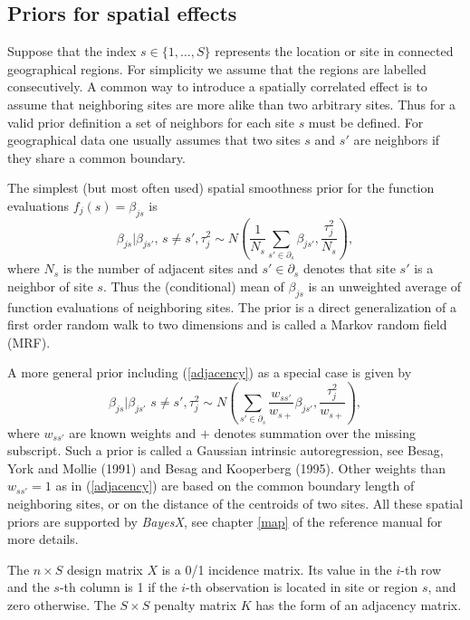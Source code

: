\documentclass[11pt,a4paper,twoside]{bayesxarticle}
\begin{document}
\subsection{Priors for spatial effects}
\label{spatial}

Suppose that the index $s \in \{ 1,\dots,S \}$ represents the
location or site in connected geographical regions. For simplicity
we assume that the regions are labelled consecutively. A common
way to introduce a spatially correlated effect is to assume that
neighboring sites are more alike than two arbitrary sites. Thus
for a valid prior definition a set of neighbors for each site $s$
must be defined. For geographical data one usually assumes that
two sites $s$ and $s'$ are neighbors if they share a common
boundary.

The simplest (but most often used) spatial smoothness prior for
the function evaluations $f_j(s)=\beta_{js}$ is
\begin{equation}
\label{adjacency} \beta_{js} | \beta_{js'}, \, {s \neq
s'},\tau_j^2 \sim N \left( \frac{1}{N_s} \sum_{s' \in \partial_s}
\beta_{js'} , \frac{\tau_j^2}{N_s} \right),
\end{equation}
where $N_s$ is the number of adjacent sites and $s' \in
\partial_s$ denotes that site $s'$ is a neighbor of site $s$. Thus
the (conditional) mean of $\beta_{js}$ is an unweighted average of
function evaluations of neighboring sites. The prior is a direct
generalization of a first order random walk to two dimensions and
is called a Markov random field (MRF).

A more general prior including (\ref{adjacency}) as a special case
is given by
\begin{equation}
\label{intrinsic} \beta_{js} | \beta_{js'} \, \, {s \neq
s'},\tau_j^2 \sim N \left( \sum_{s' \in \partial_s}
\frac{w_{ss'}}{w_{s+}} \beta_{js'}, \frac{\tau_j^2}{w_{s+}} \right),
\end{equation}
where $w_{ss'}$ are known weights and $+$ denotes summation over the
missing subscript. Such a prior is called a Gaussian intrinsic
autoregression, see Besag, York and Mollie (1991) and Besag and
Kooperberg (1995). Other weights than $w_{ss'} = 1$ as in
(\ref{adjacency}) are based on the common boundary length of
neighboring sites, or on the distance of the centroids of two sites.
All these spatial priors are supported by {\em BayesX}, see chapter
\ref*{map} of the reference manual for more details.

The $n \times S$ design matrix $X$ is a 0/1 incidence matrix. Its
value in the $i$-th row and the $s$-th column is 1 if the $i$-th
observation is located in site or region $s$, and zero otherwise.
The $S \times S$ penalty matrix $K$ has the form of an adjacency
matrix.
\end{document}
